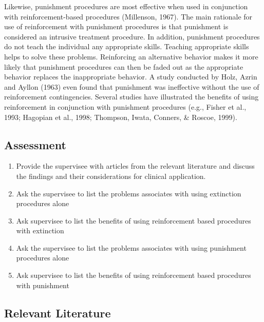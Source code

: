 Likewise, punishment procedures are most effective when used in conjunction with reinforcement-based procedures (Millenson, 1967).  The main rationale for use of reinforcement with punishment procedures is that punishment is considered an intrusive treatment procedure. In addition, punishment procedures do not teach the individual any appropriate skills. Teaching appropriate skills helps to solve these problems. Reinforcing an alternative behavior makes it more likely that punishment procedures can then be faded out as the appropriate behavior replaces the inappropriate behavior. A study conducted by Holz, Azrin and Ayllon (1963) even found that punishment was ineffective without the use of reinforcement contingencies.  Several studies have illustrated the benefits of using reinforcement in conjunction with punishment procedures (e.g., Fisher et al., 1993; Hagopian et al., 1998; Thompson, Iwata, Conners, \& Roscoe, 1999).
%
\subsection{Assessment}
\begin{enumerate}
\item Provide the supervisee with articles from the relevant literature and discuss the findings and their considerations for clinical application. 
\item Ask the supervisee to list the problems associates with using extinction procedures alone 
\item Ask supervisee to list the benefits of using reinforcement based procedures with extinction
\item Ask the supervisee to list the problems associates with using punishment procedures alone
\item Ask supervisee to list the benefits of using reinforcement based procedures with punishment
\end{enumerate}
%
\subsection{Relevant Literature}
\begin{refsection}
\nocite{cooper2007applied,
        fisher1993functional,
        hagopian1998effectiveness,
        holz1963elimination,
        lerman1999side,
        millenson1967principles,
        piazza2003relative,
        thompson1999effects}
\printbibliography[heading=none]
\end{refsection}
